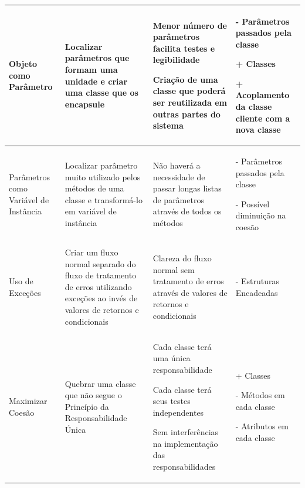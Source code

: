 \begin{landscape}
\begin{table}[hbt]
\begin{tabular}{|p{3.5cm}|p{5cm}|p{8.5cm}|p{7.2cm}|}
\hline
Objeto como Parâmetro
& Localizar parâmetros que formam uma unidade e criar uma classe que os encapsule
& \begin{my_itemize}
	\item Menor número de parâmetros facilita testes e legibilidade
	\item Criação de uma classe que poderá ser reutilizada em outras partes do sistema
  \end{my_itemize}
& \begin{my_itemize}
	\item[-] Parâmetros passados pela classe
	\item[+] Classes
	\item[+] Acoplamento da classe cliente com a nova classe
  \end{my_itemize}
\tabularnewline

\hline
Parâmetros como Variável de Instância
& Localizar parâmetro muito utilizado pelos métodos de uma classe e transformá-lo em variável de instância
& \begin{my_itemize}
	\item Não haverá a necessidade de passar longas listas de parâmetros através de todos os métodos
  \end{my_itemize}
& \begin{my_itemize}
	\item[-] Parâmetros passados pela classe
	\item[-] Possível diminuição na coesão
  \end{my_itemize}
\tabularnewline

\hline
Uso de Exceções
& Criar um fluxo normal separado do fluxo de tratamento de erros utilizando exceções ao invés de valores de retornos e condicionais
& \begin{my_itemize}
	\item Clareza do fluxo normal sem tratamento de erros através de valores de retornos e condicionais
  \end{my_itemize}
& \begin{my_itemize}
	\item[-] Estruturas Encadeadas
  \end{my_itemize}
\tabularnewline

\hline
Maximizar Coesão
& Quebrar uma classe que não segue o Princípio da Responsabilidade Única
& \begin{my_itemize}
	\item Cada classe terá uma única responsabilidade
	\item Cada classe terá seus testes independentes
	\item Sem interferências na implementação das responsabilidades
  \end{my_itemize}
& \begin{my_itemize}
	\item[+] Classes
	\item[-] Métodos em cada classe
	\item[-] Atributos em cada classe
  \end{my_itemize}
\tabularnewline
\hline
\end{tabular}


\end{table}
\end{landscape}
